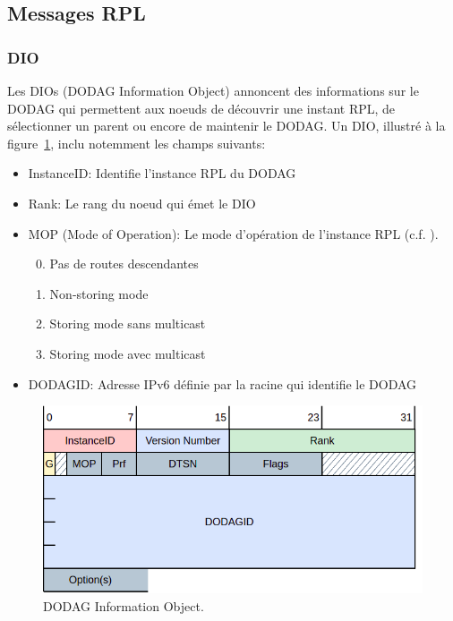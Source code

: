 \subsection*{Messages RPL}

\subsubsection*{DIO}%
    Les DIOs (DODAG Information Object) annoncent des informations sur le DODAG qui permettent aux noeuds de découvrir une instant RPL, de sélectionner un parent ou encore de maintenir le DODAG.
    Un DIO, illustré à la figure~\ref{fig:state-dio}, inclu notemment les champs suivants:
    \begin{itemize}
        \item InstanceID: Identifie l'instance RPL du DODAG
        \item Rank: Le rang du noeud qui émet le DIO
        \item MOP (Mode of Operation): Le mode d'opération de l'instance RPL (c.f. ).
        \begin{enumerate}
            \setcounter{enumi}{-1}
            \item Pas de routes descendantes
            \item Non-storing mode
            \item Storing mode sans multicast
            \item Storing mode avec multicast
        \end{enumerate}
        \item DODAGID: Adresse IPv6 définie par la racine qui identifie le DODAG
    \end{itemize}
    \begin{figure}[H]
        \centering
        \includegraphics[scale=0.5]{res/dio.drawio.png}
        \caption{DODAG Information Object.}
        \label{fig:state-dio}
    \end{figure}

